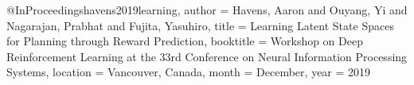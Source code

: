@InProceedings{havens2019learning,
  author = {Havens, Aaron and Ouyang, Yi and Nagarajan, Prabhat and Fujita, Yasuhiro},
  title = {Learning Latent State Spaces for Planning through Reward Prediction},
  booktitle = {Workshop on Deep Reinforcement Learning at the 33rd Conference on Neural Information Processing Systems},
  location = {Vancouver, Canada},
  month = {December},
  year = {2019}
}